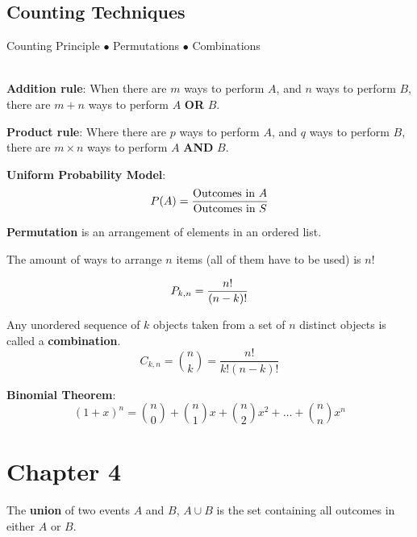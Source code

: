 \documentclass[english, 12pt]{article}
\begin{document}
\subsection{Counting Techniques}
Counting Principle $\bullet$ Permutations $\bullet$ Combinations\\\\

\begin{defn}
\textbf{Addition rule}: When there are $m$ ways to perform $A$, and $n$ ways to perform $B$, there are $m+n$ ways to perform $A$ \textbf{OR} $B$.
\end{defn}

\begin{defn}
\textbf{Product rule}: Where there are $p$ ways to perform $A$, and $q$ ways to perform $B$, there are $m \times n$ ways to perform $A$ \textbf{AND} $B$.
\end{defn}

\begin{defn}
\textbf{Uniform Probability Model}:
\[P(A) = \frac{\text{Outcomes in } A}{\text{Outcomes in } S} \]
\end{defn}

\begin{defn}
\textbf{Permutation} is an arrangement of elements in an ordered list.
\begin{note}
The amount of ways to arrange $n$ items (all of them have to be used) is $n!$
\end{note}
\[P_{k,n} = \frac{n!}{(n-k)!}\]
\end{defn}

\begin{defn}
Any unordered sequence of $k$ objects taken from a set of $n$ distinct objects is called a \textbf{combination}.
\[C_{k,n} = \binom{n}{k} = \frac{n!}{k! (n-k)!}\]
\end{defn}

\begin{exmp}
\textbf{Binomial Theorem}:
\[(1+x)^n = \binom{n}{0} + \binom{n}{1} x + \binom{n}{2} x^2 + \dots + \binom{n}{n} x^n\]
\end{exmp}

\section{Chapter 4}

\begin{defn}
The \textbf{union} of two events $A$ and $B$, $A \cup B$ is the set containing all outcomes in either $A$ or $B$.
\end{defn}
\end{document}
